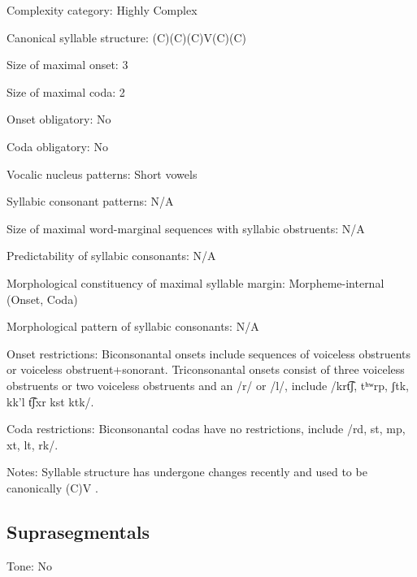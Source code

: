 {\begin{appendixdesc}
\item[Complexity category:] Highly Complex

\item[Canonical syllable structure:] (C)(C)(C)V(C)(C) \citep[40--46]{Haspelmath1993}

\item[Size of maximal onset:] 3

\item[Size of maximal coda:] 2

\item[Onset obligatory:] No

\item[Coda obligatory:] No

\item[Vocalic nucleus patterns:] Short vowels

\item[Syllabic consonant patterns:] N/A

\item[Size of maximal word-marginal sequences with syllabic obstruents:] N/A

\item[Predictability of syllabic consonants:] N/A

\item[Morphological constituency of maximal syllable margin:] Morpheme-internal (Onset, Coda)

\item[Morphological pattern of syllabic consonants:] N/A

\item[Onset restrictions:] Biconsonantal onsets include sequences of voiceless obstruents or voiceless obstruent+sonorant. Triconsonantal onsets consist of three voiceless obstruents or two voiceless obstruents and an /r/ or /l/, include /krt͡ʃ, tʰʷrp, ʃtk, kk'l t͡ʃxr kst ktk/.

\item[Coda restrictions:] Biconsonantal codas have no restrictions, include /rd, st, mp, xt, lt, rk/.

\item[Notes:] Syllable structure has undergone changes recently and used to be canonically (C)V \citep[46]{Haspelmath1993}.
\end{appendixdesc}
\subsection*{Suprasegmentals}
\begin{appendixdesc}
\item[Tone:] No


\end{appendixdesc}}
